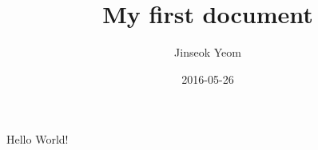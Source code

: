 \documentclass{article}
\title{My first document}
\date{2016-05-26}
\author{Jinseok Yeom}
\begin{document}
    \maketitle
    \newpage

    Hello World!
\end{document}
